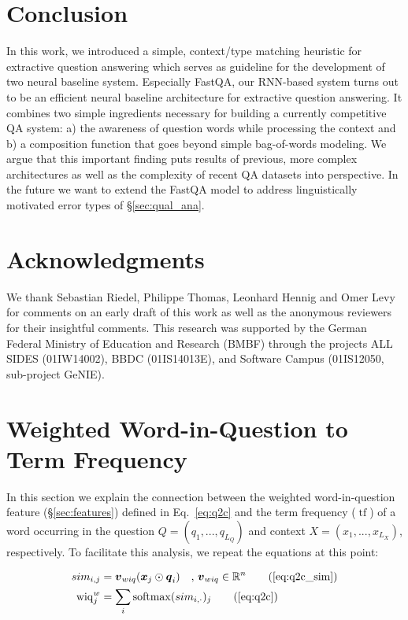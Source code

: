 \documentclass[11pt,a4paper]{article}
\begin{document}
\section{Conclusion}

In this work, we introduced a simple, context/type matching heuristic for extractive question answering which serves as guideline for the development of two neural baseline system. Especially FastQA, our RNN-based system turns out to be an efficient neural baseline architecture for extractive question answering. It combines two simple ingredients necessary for building a currently competitive QA system: a) the awareness of question words while processing the context and b) a composition function that goes beyond simple bag-of-words modeling. We argue that this important finding puts results of previous, more complex architectures as well as the complexity of recent QA datasets into perspective. In the future we want to extend the FastQA model to address linguistically motivated error types of \S\ref{sec:qual_ana}.

\section*{Acknowledgments}
We thank Sebastian Riedel, Philippe Thomas, Leonhard Hennig and Omer Levy for comments on an early draft of this work as well as the anonymous reviewers for their insightful comments. This research was supported by the German Federal Ministry of Education and 
Research (BMBF) through the projects ALL SIDES (01IW14002), BBDC (01IS14013E), and Software Campus (01IS12050, sub-project GeNIE).




\clearpage

\appendix

\section{Weighted Word-in-Question to Term Frequency}\label{sec:wiq_tf}


In this section we explain the connection between the weighted word-in-question feature (\S\ref{sec:features}) defined in Eq.~\ref{eq:q2c} and the term frequency ($\operatorname{tf}$) of a word occurring in the question $Q=(q_1, ..., q_{L_Q})$ and context $X=(x_1, ..., x_{L_X})$, respectively. To facilitate this analysis, we repeat the equations at this point:

\begin{align}
    sim_{i,j} &= \boldsymbol{v}_{wiq} ( \boldsymbol{x}_j \odot \boldsymbol{q}_i ) \quad , \, \boldsymbol{v}_{wiq} \in \mathbb{R}^n \tag{\ref{eq:q2c_sim}} \\
    \operatorname{wiq}^w_j &= \sum_i \operatorname{softmax}( sim_{i,\cdot} )_j \tag{\ref{eq:q2c}}
\end{align}
\end{document}
